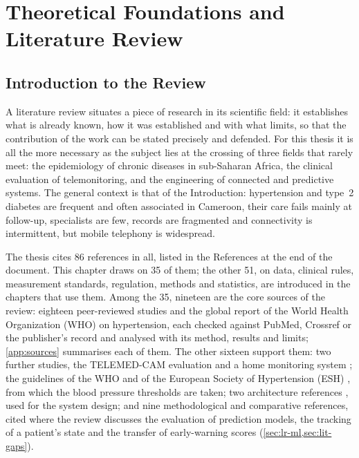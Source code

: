 \documentclass[11pt,a4paper,oneside]{report}
\begin{document}
\chapter{Theoretical Foundations and Literature Review}\label{ch:review}\label{ch:background}\label{ch:litreview}

\section{Introduction to the Review}\label{sec:lr-intro}

A literature review situates a piece of research in its scientific field: it establishes what is already known, how it was established and with what limits, so that the contribution of the work can be stated precisely and defended. For this thesis it is all the more necessary as the subject lies at the crossing of three fields that rarely meet: the epidemiology of chronic diseases in sub-Saharan Africa, the clinical evaluation of telemonitoring, and the engineering of connected and predictive systems. The general context is that of the Introduction: hypertension and type~2 diabetes are frequent and often associated in Cameroon, their care fails mainly at follow-up, specialists are few, records are fragmented and connectivity is intermittent, but mobile telephony is widespread.

The thesis cites 86 references in all, listed in the References at the end of the document. This chapter draws on 35 of them; the other 51, on data, clinical rules, measurement standards, regulation, methods and statistics, are introduced in the chapters that use them. Among the 35, nineteen are the core sources of the review: eighteen peer-reviewed studies and the global report of the World Health Organization (WHO) on hypertension, each checked against PubMed, Crossref or the publisher's record and analysed with its method, results and limits; \cref{app:sources} summarises each of them. The other sixteen support them: two further studies, the TELEMED-CAM evaluation \parencite{kingue2013} and a home monitoring system \parencite{chatrati2022}; the guidelines of the WHO \parencite{who2021guideline,whoHEARTS} and of the European Society of Hypertension (ESH) \parencite{mancia2023}, from which the blood pressure thresholds are taken; two architecture references \parencite{mucchi2021,yazdani2018}, used for the system design; and nine methodological and comparative references, cited where the review discusses the evaluation of prediction models, the tracking of a patient's state and the transfer of early-warning scores (\cref{sec:lr-ml,sec:lit-gaps}).
\end{document}
